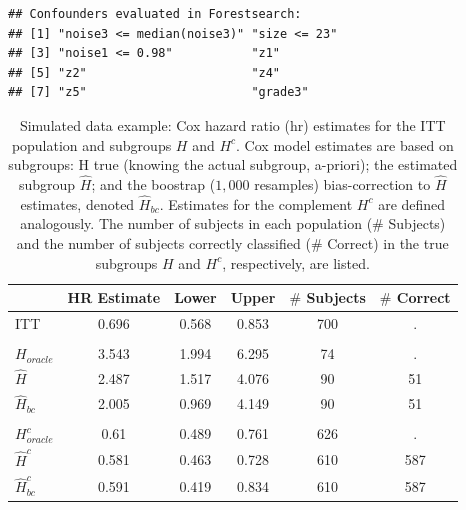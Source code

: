 \documentclass[smallextended]{svjour3}
\makeatletter
\newenvironment{kframe}{%
 \def\at@end@of@kframe{}%
 \ifinner\ifhmode%
  \def\at@end@of@kframe{\end{minipage}}%
  \begin{minipage}{\columnwidth}%
 \fi\fi%
 \def\FrameCommand##1{\hskip\@totalleftmargin \hskip-\fboxsep
 \colorbox{shadecolor}{##1}\hskip-\fboxsep
     \hskip-\linewidth \hskip-\@totalleftmargin \hskip\columnwidth}%
 \MakeFramed {\advance\hsize-\width
   \@totalleftmargin\z@ \linewidth\hsize
   \@setminipage}}%
 {\par\unskip\endMakeFramed%
 \at@end@of@kframe}
\newenvironment{knitrout}{}{} %
\makeatother
\begin{document}
\begin{knitrout}
\color{fgcolor}\begin{kframe}
\begin{verbatim}
## Confounders evaluated in Forestsearch:
## [1] "noise3 <= median(noise3)" "size <= 23"              
## [3] "noise1 <= 0.98"           "z1"                      
## [5] "z2"                       "z4"                      
## [7] "z5"                       "grade3"
\end{verbatim}
\end{kframe}
\end{knitrout}





\begin{table}

\caption{\label{tab:simex_tab}\label{tab:simex} Simulated data example: Cox hazard ratio (hr) estimates for the ITT population and subgroups $H$ and $H^{c}$.
Cox model estimates are based on subgroups: H true (knowing the actual subgroup, a-priori); the estimated subgroup $\hat{H}$; and 
the boostrap ($1,000$ resamples) bias-correction to $\hat{H}$ estimates, denoted $\hat{H}_{bc}$.  Estimates for the complement $H^{c}$ are defined analogously.
The number of subjects in each population ($\#$ Subjects) and the number of subjects correctly classified ($\#$ Correct) in the true subgroups $H$ and $H^{c}$, respectively, are listed.}
\centering
\fontsize{9}{11}\selectfont
\begin{tabular}[t]{lccccc}
\toprule
  & HR Estimate & Lower & Upper & $\#$ Subjects & $\#$ Correct\\
\midrule
ITT & 0.696 & 0.568 & 0.853 & 700 & .\\
\addlinespace[0.3em]
\multicolumn{6}{l}{\textbf{H subgroup estimates}}\\
\hspace{1em}$H_{oracle}$ & 3.543 & 1.994 & 6.295 & 74 & .\\
\hspace{1em}$\hat{H}$ & 2.487 & 1.517 & 4.076 & 90 & 51\\
\hspace{1em}$\hat{H}_{bc}$ & 2.005 & 0.969 & 4.149 & 90 & 51\\
\addlinespace[0.3em]
\multicolumn{6}{l}{\textbf{H-complement subgroup estimates}}\\
\hspace{1em}$H^{c}_{oracle}$ & 0.61 & 0.489 & 0.761 & 626 & .\\
\hspace{1em}$\hat{H}^{c}$ & 0.581 & 0.463 & 0.728 & 610 & 587\\
\hspace{1em}$\hat{H}^{c}_{bc}$ & 0.591 & 0.419 & 0.834 & 610 & 587\\
\bottomrule
\end{tabular}
\end{table}





\end{document}
